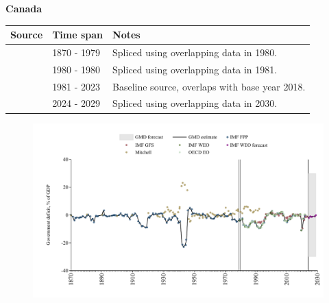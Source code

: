 \documentclass[12pt,a4paper,landscape]{article}
\begin{document}
\begin{adjustbox}{max totalsize={\paperwidth}{\paperheight},center}
\begin{minipage}[t][\textheight][t]{\textwidth}
\vspace*{0.5cm}
{}
\begin{center}
{\Large\bfseries Canada}
\end{center}
\vspace{0.5cm}
\begin{table}[H]
\centering
\small
\begin{tabular}{|l|l|l|}
\hline
\textbf{Source} & \textbf{Time span} & \textbf{Notes} \\
\hline
\rowcolor{white}\cite{IMF_FPP}& 1870 - 1979 &Spliced using overlapping data in 1980.\\
\rowcolor{lightgray}\cite{IMF_WEO}& 1980 - 1980 &Spliced using overlapping data in 1981.\\
\rowcolor{white}\cite{OECD_EO}& 1981 - 2023 &Baseline source, overlaps with base year 2018.\\
\rowcolor{lightgray}\cite{IMF_WEO_forecast}& 2024 - 2029 &Spliced using overlapping data in 2030.\\
\hline
\end{tabular}
\end{table}
\begin{figure}[H]
\centering
\includegraphics[width=\textwidth,height=0.6\textheight,keepaspectratio]{graphs/CAN_govdef_GDP.pdf}
\end{figure}
\end{minipage}
\end{adjustbox}
\end{document}

